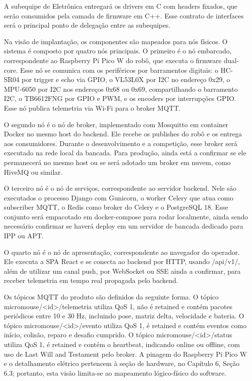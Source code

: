     A subequipe de Eletrônica entregará os drivers em C com headers fixados, que serão consumidos pela camada de firmware em C++. Esse contrato de interfaces será o principal ponto de delegação entre as subequipes.

    Na visão de implantação, os componentes são mapeados para nós físicos. O sistema é composto por quatro nós principais. O primeiro é o nó embarcado, correspondente ao Raspberry Pi Pico W do robô, que executa o firmware dual-core. Esse nó se comunica com os periféricos por barramentos digitais: o HC-SR04 por trigger e echo via GPIO, o VL53L0X por I2C no endereço 0x29, o MPU-6050 por I2C nos endereços 0x68 ou 0x69, compartilhando o barramento I2C, o TB6612FNG por GPIO e PWM, e os encoders por interrupções GPIO. Esse nó publica telemetria via Wi-Fi para o broker MQTT.

    O segundo nó é o nó de broker, implementado com Mosquitto em container Docker no mesmo host do backend. Ele recebe os publishes do robô e os entrega aos consumidores. Durante o desenvolvimento e a competição, esse broker será executado na rede local da bancada. Para produção, ainda está a confirmar se ele permanecerá no mesmo host ou se será adotado um broker em nuvem, como HiveMQ ou similar.

    O terceiro nó é o nó de serviços, correspondente ao servidor backend. Nele são executados o processo Django com Gunicorn, o worker Celery que atua como subscriber MQTT, o Redis como broker do Celery e o PostgreSQL 18. Esse conjunto será empacotado em docker-compose para rodar localmente, ainda sendo necessário confirmar se haverá deploy em um servidor de bancada dedicado para IPP ou APT.

    O quarto nó é o nó de apresentação, correspondente ao navegador do operador. Ele executa a SPA React e se conecta ao backend por HTTP, usando /api/v1/, além de utilizar um canal push, por WebSocket ou SSE ainda a confirmar, para receber telemetria em tempo real propagada pelo backend.

    Os tópicos MQTT do produto são definidos da seguinte forma. O tópico micromouse/\textless{}id\textgreater{}/telemetria utiliza QoS 1, não é retained e contém pacotes periódicos entre 10 e 30 Hz, incluindo pose, matriz delta, velocidade e bateria. O tópico micromouse/\textless{}id\textgreater{}/evento utiliza QoS 1, é retained e contém eventos como início, colisão, reparo e desafio cumprido. O tópico micromouse/\textless{}id\textgreater{}/status utiliza QoS 1, é retained e contém o heartbeat, indicando online ou offline, com uso de Last Will and Testament pelo broker. A pinagem do Raspberry Pi Pico W e o detalhamento elétrico pertencem à seção de hardware, no Capítulo 6, Seção 6.3; portanto, esta visão limita-se ao mapeamento lógico-físico do software.

